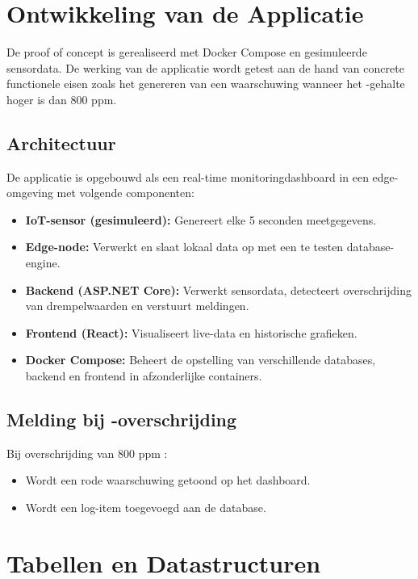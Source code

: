 \section{Ontwikkeling van de Applicatie}

De proof of concept is gerealiseerd met Docker Compose en gesimuleerde sensordata. De werking van de applicatie wordt getest aan de hand van concrete functionele eisen zoals het genereren van een waarschuwing wanneer het -gehalte hoger is dan 800 ppm.

\subsection{Architectuur}

De applicatie is opgebouwd als een real-time monitoringdashboard in een edge-omgeving met volgende componenten:

\begin{itemize}
    \item \textbf{IoT-sensor (gesimuleerd):} Genereert elke 5 seconden meetgegevens.
    \item \textbf{Edge-node:} Verwerkt en slaat lokaal data op met een te testen database-engine.
    \item \textbf{Backend (ASP.NET Core):} Verwerkt sensordata, detecteert overschrijding van drempelwaarden en verstuurt meldingen.
    \item \textbf{Frontend (React):} Visualiseert live-data en historische grafieken.
    \item \textbf{Docker Compose:} Beheert de opstelling van verschillende databases, backend en frontend in afzonderlijke containers.
\end{itemize}

\subsection{Melding bij -overschrijding}

Bij overschrijding van 800 ppm :
\begin{itemize}
    \item Wordt een rode waarschuwing getoond op het dashboard.
    \item Wordt een log-item toegevoegd aan de database.
\end{itemize}

\section{Tabellen en Datastructuren}

